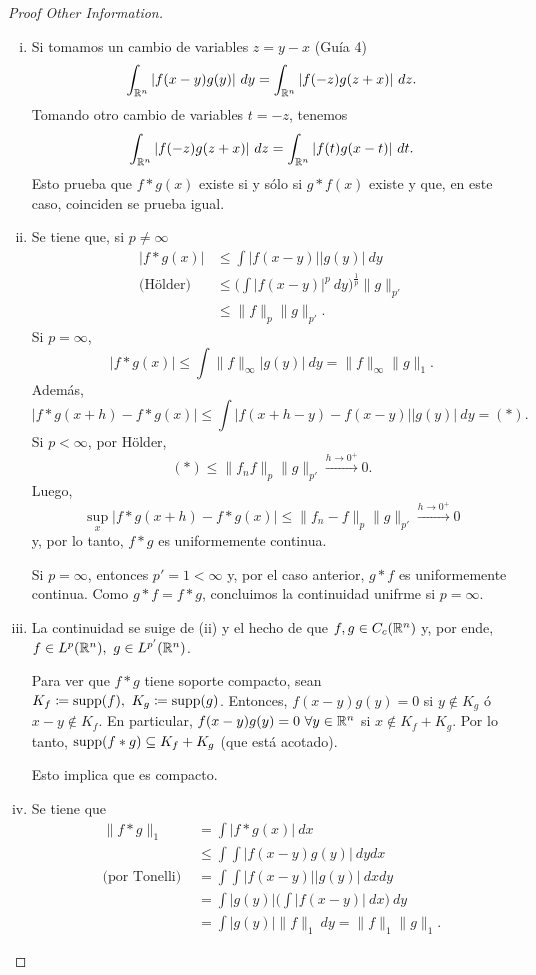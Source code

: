 \begin{proof}[Proof Other Information]
	\begin{enumerate}[i.]
		\item Si tomamos un cambio de variables $z = y - x$ (Guía 4)
		\[ \int_{\R^{n}} | f(x - y) g (y) | \ dy = \int_{\R^{n}} | f(-z) g(z + x) | \ dz. \]
		Tomando otro cambio de variables $t = -z$, tenemos
		\[ \int_{\R^{n}} | f(-z) g(z + x) | \ dz = \int_{\R^{n}} | f(t) g(x - t) | \ dt. \]
		Esto prueba que $f * g (x)$ existe si y sólo si $g * f (x)$ existe y que, en este caso, coinciden se prueba igual.

		\item Se tiene que, si $p \neq \infty$
		\begin{align*}
			| f * g (x) | &\leq \int |f(x - y)| |g(y)| \ dy \\
			\text{(Hölder) } &\leq \Big( \int |f(x-y)|^{p} \ dy \Big)^{\frac{1}{p}} \| g \|_{p'} \\
			&\leq \| f \|_{p} \| g \|_{p'}
		.\end{align*}
		Si $p = \infty$,
		\[ |f * g (x)| \leq \int \| f \|_{\infty} |g(y)| \ dy = \| f \|_{\infty} \| g \|_{1}. \]
		Además,
		\[ |f * g (x + h) - f * g (x)| \leq \int |f(x + h - y) - f(x - y)| |g(y)| \ dy = (*). \]
		Si $p < \infty$, por Hölder,
		\[ (*) \leq \| f_{n}  f \|_{p} \| g \|_{p'} \stackrel{h \to 0^{+}}{\longrightarrow} 0. \]
		Luego,
		\[ \sup_{x} |f * g (x + h) - f * g (x)| \leq \| f_{n} - f \|_{p} \| g \|_{p'} \stackrel{h \to 0^{+}}{\longrightarrow} 0 \]
		y, por lo tanto, $f * g$ es uniformemente continua. \par
		Si $p = \infty$, entonces $p' = 1 < \infty$ y, por el caso anterior, $g * f$ es uniformemente continua. Como $g * f = f * g$, concluimos la continuidad unifrme si $p = \infty$.

		\item La continuidad se suige de (ii) y el hecho de que $f,g \in C_{c}(\mathbb{R}^{n})$ y, por ende, $f \in L^{p}(\mathbb{R}^{n}),\ g \in L^{p'}(\mathbb{R}^{n})$. \par
		Para ver que $f * g$ tiene soporte compacto, sean $K_{f} \coloneq \operatorname{supp}(f), \ K_{g} \coloneq \operatorname{supp}(g)$. Entonces, $f(x - y) g(y) = 0$ si $y \not\in K_{g}$ ó $x - y \not\in K_{f}$. En particular, $f(x - y) g(y) = 0 \ \forall y \in \mathbb{R}^{n}$ si $x \not\in K_{f} + K_{g}$. Por lo tanto, $\operatorname{supp}(f * g) \subseteq K_{f} + K_{g}$ (que está acotado). \par 
		Esto implica que es compacto.

		\item Se tiene que
		\begin{align*}
			\| f * g \|_{1} &= \int |f * g (x)| \ dx \\
			&\leq \int \int |f(x - y) g(y)| \ dy dx \\
			\text{(por Tonelli) } &= \int \int |f(x -y)| |g(y)| \ dx dy \\
			&= \int |g(y)| \Big( \int |f(x - y)| \ dx \Big) \ dy \\
			&= \int |g(y)| \| f \|_{1} \ dy = \| f \|_{1} \| g \|_{1}
		.\end{align*}
	\end{enumerate}
\end{proof}

